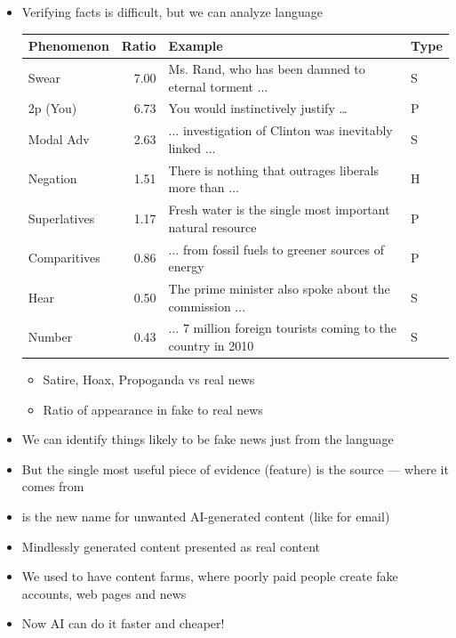 \documentclass[a4paper,landscape,headrule,footrule,xetex]{foils}
\begin{document}
\begin{itemize}
\item Verifying facts is difficult, but we can analyze language \citep{rashkin-etal-2017-truth}
  \\[2ex]
  \begin{small}
    \begin{tabular}{lrll}
      Phenomenon & Ratio & Example & Type \\
      \hline
      Swear& 7.00& Ms. Rand, who has been damned to eternal torment
                  ...& S\\
      2p (You) & 6.73 & You would instinctively justify \ldots & P  \\
      Modal Adv &2.63 &  ... investigation of Clinton  was inevitably
                        linked ... & S \\
      Negation &  1.51 &  There is nothing that outrages liberals more
                         than ...  & H \\
      Superlatives &   1.17 &  Fresh water is the single most
                              important natural resource  &  P \\[2ex]
      Comparitives &   0.86  &  ... from fossil fuels to
                               greener sources of energy  & P  \\
      Hear & 0.50 & The prime minister also spoke about the commission ... &
                                                                       S \\
      Number & 0.43 &  ... 7 million foreign tourists coming to the
                      country in 2010 & S \\
    \end{tabular}
  \end{small}
  \begin{itemize}
  \item   Satire, Hoax, Propoganda vs real news
  \item Ratio of appearance in fake to real news
  \end{itemize}
\item We can identify things likely to be fake news just from the
  language
\item But the single most useful piece of evidence (feature) is the
  source --- where it comes from

\end{itemize}


\begin{itemize}
\item {} is the new name for unwanted AI-generated content (like  for email)
\item Mindlessly generated content presented as real content
\item We used to have content farms, where poorly paid people create fake accounts, web pages and news
\item Now AI can do it faster and cheaper!
  
\end{itemize}
\end{document}
